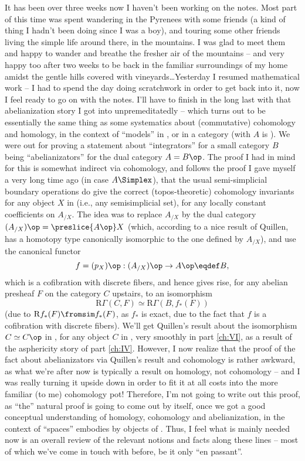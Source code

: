\label{sec:103}%
It has been over three weeks now I haven't been working on the
notes. Most part of this time was spent wandering in the Pyrenees with
some friends (a kind of thing I hadn't been doing since I was a boy),
and touring some other friends living the simple life around there, in
the mountains. I was glad to meet them and happy to wander and breathe
the fresher air of the mountains -- and very happy too after two weeks
to be back in the familiar surroundings of my home amidst the gentle
hills covered with vineyards\ldots Yesterday I resumed mathematical
work -- I had to spend the day doing scratchwork in order to get back
into it, now I feel ready to go on with the notes. I'll have to finish
in the long last with that abelianization story I got into
unpremeditatedly -- which turns out to be essentially the same thing
as some systematics about (commutative) cohomology and homology, in
the context of ``models'' in \Cat, or in a category \Ahat{} (with $A$
is \Cat). We were out for proving a statement about ``integrators''
for a small category $B$ being ``abelianizators'' for the dual
category $A=B\op$. The proof I had in mind for this is somewhat
indirect via cohomology, and follows the proof I gave myself a very
long time ago (in case $A\Simplex$), that the usual semi-simplicial
boundary operations do give the correct (topos-theoretic) cohomology
invariants for any object $X$ in \Ahat{} (i.e., any semisimplicial
set), for any locally constant coefficients on $A_{/X}$. The idea was
to replace $A_{/X}$ by the dual category
$(A_{/X})\op=\preslice{A\op}X$ (which, according to a nice result of
Quillen, has a homotopy type canonically isomorphic to the one defined
by $A_{/X}$), and use the canonical functor
\[f = (p_X)\op : (A_{/X})\op \to A\op\eqdef B,\]
which is a cofibration with discrete fibers, and hence gives rise, for
any abelian presheaf $F$ on the category $C$ upstairs, to an
isomorphism
\[\mathrm R \Gamma(C,F) \simeq \mathrm R\Gamma(B,f_*(F))\]
(due to $\mathrm Rf_*(F) \fromsim f_*(F)$, as $f_*$ is exact,
due to the fact that $f$ is a cofibration with discrete fibers). We'll
get Quillen's result about the isomorphism $C\simeq C\op$ in \Hot, for
any object $C$ in \Cat, very smoothly in part \ref{ch:VI}, as a result
of the asphericity story of part \ref{ch:IV}. However, I now realize
that the proof of the fact about abelianizators via Quillen's result
and cohomology is rather awkward, as what we're after now is typically
a result on homology, not cohomology -- and I was really turning it
upside down in order to fit it at all costs into the more
familiar (to me) cohomology pot! Therefore, I'm not going to write out
this proof, as ``the'' natural proof is going to come out by itself,
once we got a good conceptual understanding of homology, cohomology
and abelianization, in the context of ``spaces'' embodies by objects
of \Cat. Thus, I feel what is mainly needed now is an overall review
of the relevant notions and facts along these lines -- most of which
we've come in touch with before, be it only ``en passant''.

